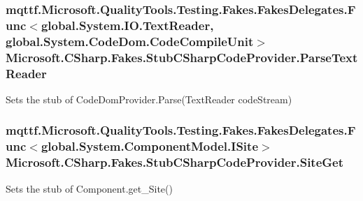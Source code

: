 \hypertarget{class_microsoft_1_1_c_sharp_1_1_fakes_1_1_stub_c_sharp_code_provider_abd0cc5894598c18b57d971f87487ef5a}{
\subsubsection[{Parse\-Text\-Reader}]{\setlength{\rightskip}{0pt plus 5cm}mqttf.\-Microsoft.\-Quality\-Tools.\-Testing.\-Fakes.\-Fakes\-Delegates.\-Func$<$global.\-System.\-I\-O.\-Text\-Reader, global.\-System.\-Code\-Dom.\-Code\-Compile\-Unit$>$ Microsoft.\-C\-Sharp.\-Fakes.\-Stub\-C\-Sharp\-Code\-Provider.\-Parse\-Text\-Reader}}\label{class_microsoft_1_1_c_sharp_1_1_fakes_1_1_stub_c_sharp_code_provider_abd0cc5894598c18b57d971f87487ef5a}


Sets the stub of Code\-Dom\-Provider.\-Parse(\-Text\-Reader code\-Stream)

\hypertarget{class_microsoft_1_1_c_sharp_1_1_fakes_1_1_stub_c_sharp_code_provider_a8f8743e5ef7afdc996a1b29c0cefcd7a}{
\subsubsection[{Site\-Get}]{\setlength{\rightskip}{0pt plus 5cm}mqttf.\-Microsoft.\-Quality\-Tools.\-Testing.\-Fakes.\-Fakes\-Delegates.\-Func$<$global.\-System.\-Component\-Model.\-I\-Site$>$ Microsoft.\-C\-Sharp.\-Fakes.\-Stub\-C\-Sharp\-Code\-Provider.\-Site\-Get}}\label{class_microsoft_1_1_c_sharp_1_1_fakes_1_1_stub_c_sharp_code_provider_a8f8743e5ef7afdc996a1b29c0cefcd7a}


Sets the stub of Component.\-get\-\_\-\-Site()

